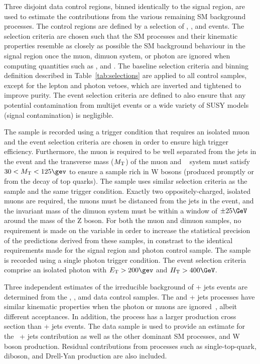 Three disjoint data control regions, binned identically to the signal
region, are used to estimate the contributions from the various
remaining SM background processes. The control regions are defined by
a selection of \mj, \mmj, and \gj events. The selection criteria are
chosen such that the SM processes and their kinematic properties
resemble as closely as possible the SM background behaviour in the
signal region once the muon, dimuon system, or photon are ignored when
computing quantities such as \scalht, \mht and \alphat. The baseline
selection criteria and binning definition described in
Table~\ref{tab:selections} are applied to all control samples, except
for the lepton and photon vetoes, which are inverted and tightened to
improve purity. The event selection criteria are defined to also
ensure that any potential contamination from multijet events or a wide
variety of SUSY models (\ie signal contamination) is negligible.

The \mj sample is recorded using a trigger condition that requires an
isolated muon and the event selection criteria are chosen in order to
ensure high trigger efficiency. Furthermore, the muon is required to
be well separated from the jets in the event and the transverse mass
($M_{\rm T}$) of the muon and \ETmiss~\cite{CMS-PAS-PFT-09-001,
  CMS-PAS-PFT-10-001} system must satisfy $30 < M_{\rm T} < 125\gev$
to ensure a sample rich in W bosons (produced promptly or from the
decay of top quarks). The \mmj sample uses similar selection criteria
as the \mj sample and the same trigger condition. Exactly two
oppositely-charged, isolated muons are required, the muons must be
distanced from the jets in the event, and the invariant mass of the
dimuon system must be within a window of $\pm 25\GeV$ around the mass
of the Z boson. For both the muon and dimuon samples, no requirement
is made on the variable \alphat in order to increase the statistical
precision of the predictions derived from these samples, in constrast
to the identical \alphat requirements made for the signal region and
photon control sample. The \gj sample is recorded using a single
photon trigger condition. The event selection criteria comprise an
isolated photon with $\Et > 200\gev$ and $\scalht > 400\GeV$.

Three independent estimates of the irreducible background of \znunu +
jets events are determined from the \gj, \mmj, amd \mj data control
samples. The \gj and \zmumu + jets processes have similar kinematic
properties when the photon or muons are ignored~\cite{Bern:2011pa}, 
albeit different acceptances. In addition, the \gj process has a
larger production cross section than \znunu + jets events. The \mj
data sample is used to provide an estimate for the \znunu\ + jets
contribution as well as the other dominant SM processes, \ttbar and W
boson production. Residual contributions from processes such as
single-top-quark, diboson, and Drell-Yan production are also included.

